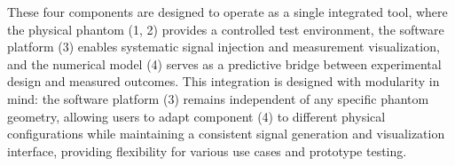 \documentclass[../00_Main.tex]{subfiles}
\begin{document}
\begin{enumerate}
\end{enumerate}

These four components are designed to operate as a single integrated tool, where the physical phantom (1, 2) provides a controlled test environment, the software platform (3) enables systematic signal injection and measurement visualization, and the numerical model (4) serves as a predictive bridge between experimental design and measured outcomes. This integration is designed with modularity in mind: the software platform (3) remains independent of any specific phantom geometry, allowing users to adapt component (4) to different physical configurations while maintaining a consistent signal generation and visualization interface, providing flexibility for various use cases and prototype testing.

\biblio %
\end{document}
